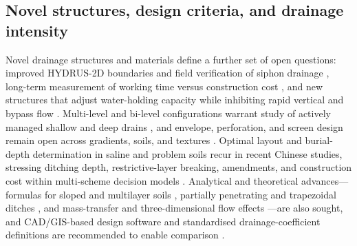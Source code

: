 \subsection{Novel structures, design criteria, and drainage intensity}

Novel drainage structures and materials define a further set of open questions:
improved HYDRUS-2D boundaries and field verification of siphon drainage
\parencite{Ren2023}, long-term measurement of working time versus construction cost
\parencite{Tao2025b}, and new structures that adjust water-holding capacity while
inhibiting rapid vertical and bypass flow \parencite{Li2021}. Multi-level and
bi-level configurations warrant study of actively managed shallow and deep drains
\parencite{Hornbuckle2007,Verma1998,Nelson2011b}, and envelope, perforation, and
screen design remain open across gradients, soils, and textures
\parencite{Alavi2021,Wu2022,Oyarce2017,HajAmor2019}. Optimal layout and
burial-depth determination in saline and problem soils recur in recent Chinese
studies, stressing ditching depth, restrictive-layer breaking, amendments, and
construction cost within multi-scheme decision models
\parencite{Tian2023,Tian2024,Tian2023c,Zhang2024d,Zhai2023,Han2023,Qian2025b,Ren2021,Zheng2025,SerranoCoronel2018,Zegeye2021}.
Analytical and theoretical advances---formulas for sloped and multilayer soils
\parencite{Tao2016,Tao2019}, partially penetrating and trapezoidal ditches
\parencite{Chahar2010,Afruzi2014}, and mass-transfer and three-dimensional flow
effects \parencite{Zhang2024}---are also sought, and CAD/GIS-based design software
and standardised drainage-coefficient definitions are recommended to enable
comparison \parencite{GALLICHAND1992b,Skaggs2017}.

